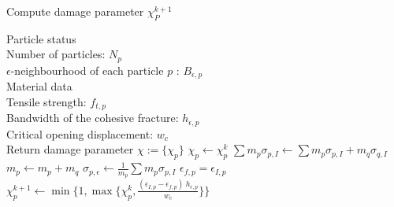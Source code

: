 \documentclass[preprint,12pt,a4paper]{elsarticle}
\begin{document}
\begin{algorithm}\caption{Compute damage parameter $\chi_P^{k+1}$}\label{alg-eigens}
  \begin{algorithmic}
    \REQUIRE Particle status\\
    Number of particles: $N_p$\\
    $\epsilon$-neighbourhood of each particle $p$ : $B_{\epsilon,p}$\\
    \REQUIRE Material data\\
    Tensile strength: $f_{t,p}$\\
    Bandwidth of the cohesive fracture: $h_{\epsilon,p}$ \\
    Critical opening displacement: $w_c$\\ 
    \ENSURE Return damage parameter $\chi := \{\chi_p\}$
    \STATE $\chi_p \leftarrow \chi_p^{k}$
    \STATE $\sum m_p\sigma_{p,I} \leftarrow \sum m_p\sigma_{p,I} + m_q\sigma_{q,I}$
    \ENDIF    
    \STATE $m_p \leftarrow m_p + m_q$
    \ENDFOR
    \STATE $\sigma_{p,\epsilon} \leftarrow \frac{1}{m_p} \sum m_p\sigma_{p,I}$
    \STATE $\epsilon_{f,p} = \epsilon_{I,p}$   
    \ENDIF        
    \STATE $\chi_p^{k+1} \leftarrow \min\Big \{1 , \max \{\chi_p^{k},
    \frac{(\epsilon_{I,p}- \epsilon_{f,p})\ h_{\epsilon,p}}{w_c} \} \Big \}$    
    \ENDIF    
    \ENDFOR
  \end{algorithmic}
\end{algorithm}


 
\end{document}
